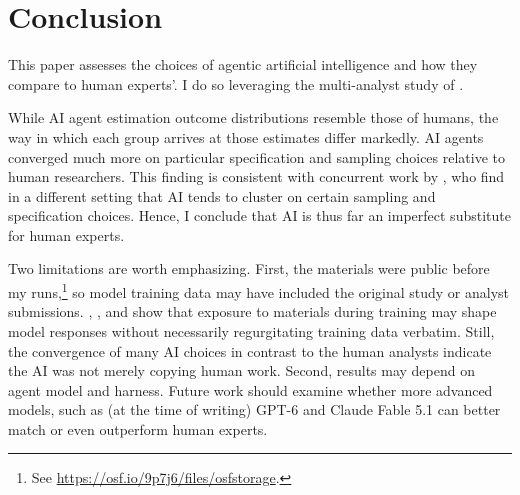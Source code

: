 \documentclass[
  12pt]{article}
\begin{document}
\section{Conclusion}\label{sec-conclusion}

This paper assesses the choices of agentic artificial intelligence and
how they compare to human experts'. I do so leveraging the multi-analyst
study of \citet{huntingtonklein2025sources}.

While AI agent estimation outcome distributions resemble those of
humans, the way in which each group arrives at those estimates differ
markedly. AI agents converged much more on particular specification and
sampling choices relative to human researchers. This finding is
consistent with concurrent work by \citet{huang2026aierrors}, who find
in a different setting that AI tends to cluster on certain sampling and
specification choices. Hence, I conclude that AI is thus far an
imperfect substitute for human experts.

Two limitations are worth emphasizing. First, the
\citet{huntingtonklein2025sources} materials were public before my
runs,\footnote{See \url{https://osf.io/9p7j6/files/osfstorage}.} so
model training data may have included the original study or analyst
submissions. \citet{karmakar2022codex}, \citet{zhang2023counterfactual},
and \citet{al2026model} show that exposure to materials during training
may shape model responses without necessarily regurgitating training
data verbatim. Still, the convergence of many AI choices in contrast to
the human analysts indicate the AI was not merely copying human work.
Second, results may depend on agent model and harness. Future work
should examine whether more advanced models, such as (at the time of
writing) GPT-6 and Claude Fable 5.1 can better match or even outperform
human experts.



\end{document}

